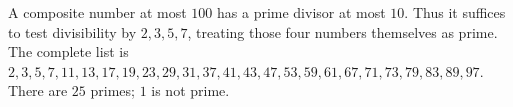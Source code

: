 A composite number at most $100$ has a prime divisor at most $10$. Thus it suffices to test divisibility by $2,3,5,7$, treating those four numbers themselves as prime. The complete list is $\boxed{2,3,5,7,11,13,17,19,23,29,31,37,41,43,47,53,59,61,67,71,73,79,83,89,97}$. There are $25$ primes; $1$ is not prime.
